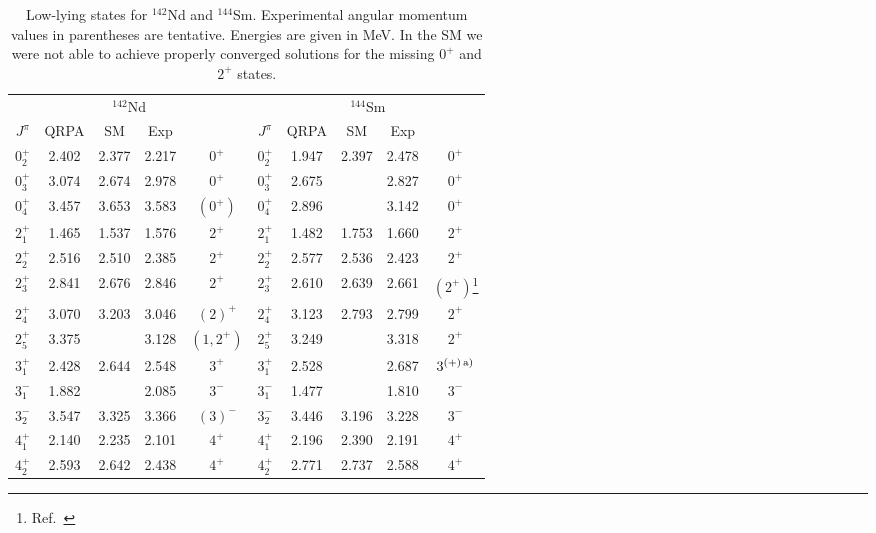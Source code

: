 \begin{table}[htbp]
\begin{center}
\caption{Low-lying states for $^{142}$Nd and $^{144}$Sm. Experimental 
angular
momentum values in parentheses are tentative. Energies are given in MeV.
In the SM we were not able to achieve properly converged
solutions for the missing $0^{+}$ and $2^{+}$ states.}
\begin{minipage}[t]{5in}
\begin{tabular}{ccccc|ccccc}
\hline
\multicolumn{5}{c|}{$^{142}$Nd} & \multicolumn{5}{c}{$^{144}$Sm} \\
$J^{\pi}$ & QRPA & SM & Exp & & $J^{\pi}$ &  
QRPA & SM & Exp & \\ 
\hline
$0^{+}_{2}$ & 2.402 & 2.377 & 2.217 & $0^{+}$ &
$0^{+}_{2}$ & 1.947 & 2.397 & 2.478 & $0^{+}$ \\
$0^{+}_{3}$ & 3.074 & 2.674 & 2.978 & $0^{+}$ &
$0^{+}_{3}$ & 2.675 &       & 2.827 & $0^{+}$ \\
$0^{+}_{4}$ & 3.457 & 3.653 & 3.583 & $(0^{+})$ &
$0^{+}_{4}$ & 2.896 &       & 3.142 & $0^{+}$ \\
$2^{+}_{1}$ & 1.465 & 1.537 & 1.576 & $2^{+}$ &
$2^{+}_{1}$ & 1.482 & 1.753 & 1.660 & $2^{+}$ \\
$2^{+}_{2}$ & 2.516 & 2.510 & 2.385 & $2^{+}$ &
$2^{+}_{2}$ & 2.577 & 2.536 & 2.423 & $2^{+}$ \\
$2^{+}_{3}$ & 2.841 & 2.676 & 2.846 & $2^{+}$ &
$2^{+}_{3}$ & 2.610 & 2.639 & 2.661 & 
$(2^{+})$\footnote[1]{Ref.\ \cite{gjb93}} \\
$2^{+}_{4}$ & 3.070 & 3.203 & 3.046 & $(2)^{+}$ &
$2^{+}_{4}$ & 3.123 & 2.793 & 2.799 & $2^{+}$ \\
$2^{+}_{5}$ & 3.375 &       & 3.128 & $(1,2^{+})$ &
$2^{+}_{5}$ & 3.249 &       & 3.318 & $2^{+}$ \\
$3^{+}_{1}$ & 2.428 & 2.644 & 2.548 & $3^{+}$ &
$3^{+}_{1}$ & 2.528 &       & 2.687 & $3^{(+)\,{\rm a})}$ \\
$3^{-}_{1}$ & 1.882 &       & 2.085 & $3^{-}$ &
$3^{-}_{1}$ & 1.477 &       & 1.810 & $3^{-}$ \\
$3^{-}_{2}$ & 3.547 & 3.325 & 3.366 & $(3)^{-}$ &
$3^{-}_{2}$ & 3.446 & 3.196 & 3.228 & $3^{-}$ \\
$4^{+}_{1}$ & 2.140 & 2.235 & 2.101 & $4^{+}$ &
$4^{+}_{1}$ & 2.196 & 2.390 & 2.191 & $4^{+}$ \\
$4^{+}_{2}$ & 2.593 & 2.642 & 2.438 & $4^{+}$ &
$4^{+}_{2}$ & 2.771 & 2.737 & 2.588 & $4^{+}$ \\

\end{tabular}
\end{minipage}
\end{center}
\end{table}
